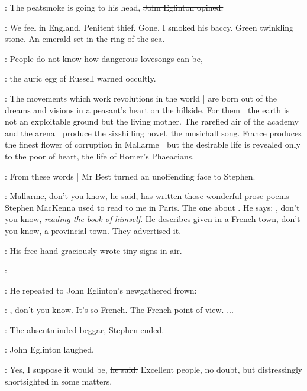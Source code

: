 \eglinton:
The peatsmoke is going to his head,
\sout{John Eglinton opined.}

\StephenInt:
We feel in England.
Penitent thief.
Gone.
I smoked his baccy.
Green twinkling stone.
An emerald set in the ring of the sea.

\AErussell:
People do not know how dangerous lovesongs can be,

:
the auric egg of Russell warned occultly.

\AErussell:
The movements which work revolutions in the world |
are born out of the dreams and visions in a peasant's heart on the hillside.
For them |
the earth is not an exploitable ground but the living mother.
The rarefied air of the academy and the arena |
produce the sixshilling novel,
the musichall song.
France produces the finest flower of corruption in Mallarme |
but the desirable life is revealed only to the poor of heart,
the life of Homer's Phaeacians.

:
From these words |
Mr Best turned an unoffending face to Stephen.

\best:
Mallarme,
don't you know,
\sout{he said,}
has written those wonderful prose poems |
Stephen MacKenna used to read to me in Paris.
The one about .
He says:
,
don't you know,
\emph{reading the book of himself}.
He describes  given in a French town,
don't you know,
a provincial town.
They advertised it.

:
His free hand graciously wrote tiny signs in air.

\best:
\begin{verse}
\end{verse}

:
He repeated to John Eglinton's newgathered frown:

\best:
,
don't you know.
It's so French.
The French point of view.
 ...

\Stephen:
The absentminded beggar,
\sout{Stephen ended.}

:
John Eglinton laughed.

\eglinton:
Yes,
I suppose it would be,
\sout{he said.}
Excellent people,
no doubt,
but distressingly shortsighted in some matters.

